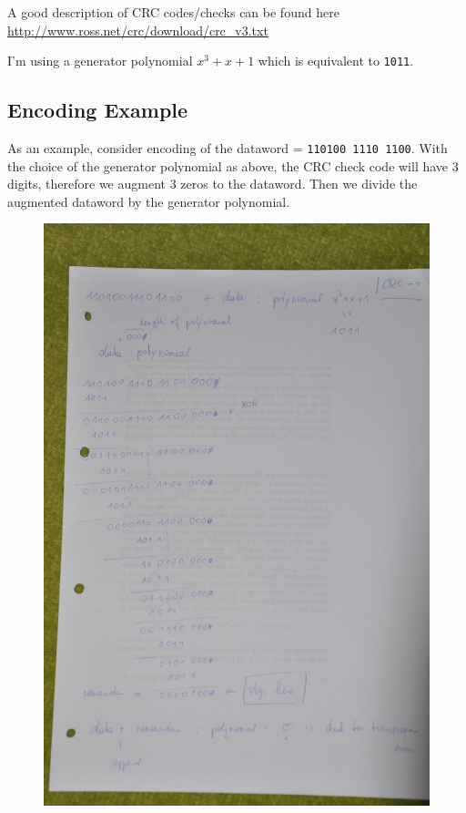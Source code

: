 
A good description of CRC codes/checks can be found here
\url{http://www.ross.net/crc/download/crc_v3.txt}

I'm using a generator polynomial \(x^3 + x + 1\) which is equivalent to
\texttt{1011}.

\subsection{Encoding Example}\label{encoding-example}

As an example, consider encoding of the dataword =
\texttt{110100\ 1110\ 1100}. With the choice of the generator polynomial
as above, the CRC check code will have 3 digits, therefore we augment 3
zeros to the dataword. Then we divide the augmented dataword by the
generator polynomial.

\begin{figure}[hbt!]
\centering
\includegraphics[scale=1.2]{images/DSC_0855_small.JPG}
\end{figure}

